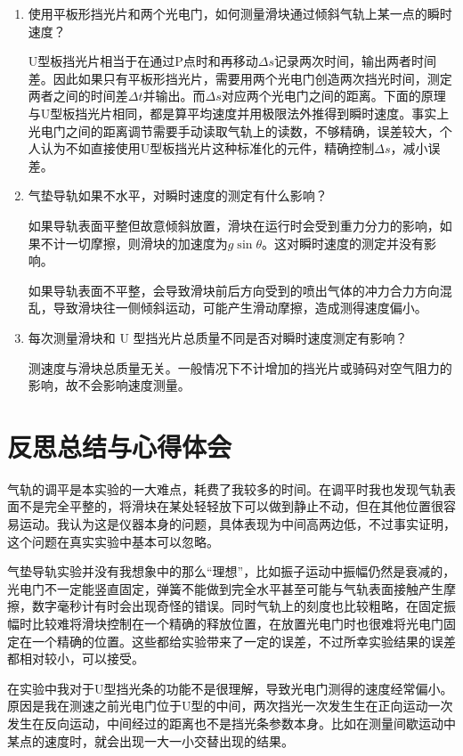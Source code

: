 \documentclass[12pt]{article}
\begin{document}
\begin{enumerate}
    \item {\kaishu 使用平板形挡光片和两个光电门，如何测量滑块通过倾斜气轨上某一点的瞬时速度？}
    
    U型板挡光片相当于在通过P点时和再移动$\Delta s$记录两次时间，输出两者时间差。因此如果只有平板形挡光片，需要用两个光电门创造两次挡光时间，测定两者之间的时间差$\Delta t$并输出。而$\Delta s$对应两个光电门之间的距离。下面的原理与U型板挡光片相同，都是算平均速度并用极限法外推得到瞬时速度。事实上光电门之间的距离调节需要手动读取气轨上的读数，不够精确，误差较大，个人认为不如直接使用U型板挡光片这种标准化的元件，精确控制$\Delta s$，减小误差。

    \item {\kaishu 气垫导轨如果不水平，对瞬时速度的测定有什么影响？}
    
    如果导轨表面平整但故意倾斜放置，滑块在运行时会受到重力分力的影响，如果不计一切摩擦，则滑块的加速度为$g\sin\theta$。这对瞬时速度的测定并没有影响。

    如果导轨表面不平整，会导致滑块前后方向受到的喷出气体的冲力合力方向混乱，导致滑块往一侧倾斜运动，可能产生滑动摩擦，造成测得速度偏小。

    \item {\kaishu 每次测量滑块和 U 型挡光片总质量不同是否对瞬时速度测定有影响？}
    
    测速度与滑块总质量无关。一般情况下不计增加的挡光片或骑码对空气阻力的影响，故不会影响速度测量。
\end{enumerate}

\section{反思总结与心得体会}
气轨的调平是本实验的一大难点，耗费了我较多的时间。在调平时我也发现气轨表面不是完全平整的，将滑块在某处轻轻放下可以做到静止不动，但在其他位置很容易运动。我认为这是仪器本身的问题，具体表现为中间高两边低，不过事实证明，这个问题在真实实验中基本可以忽略。

气垫导轨实验并没有我想象中的那么“理想”，比如振子运动中振幅仍然是衰减的，光电门不一定能竖直固定，弹簧不能做到完全水平甚至可能与气轨表面接触产生摩擦，数字毫秒计有时会出现奇怪的错误。同时气轨上的刻度也比较粗略，在固定振幅时比较难将滑块控制在一个精确的释放位置，在放置光电门时也很难将光电门固定在一个精确的位置。这些都给实验带来了一定的误差，不过所幸实验结果的误差都相对较小，可以接受。

在实验中我对于U型挡光条的功能不是很理解，导致光电门测得的速度经常偏小。原因是我在测速之前光电门位于U型的中间，两次挡光一次发生生在正向运动一次发生在反向运动，中间经过的距离也不是挡光条参数本身。比如在测量间歇运动中某点的速度时，就会出现一大一小交替出现的结果。
\end{document}
